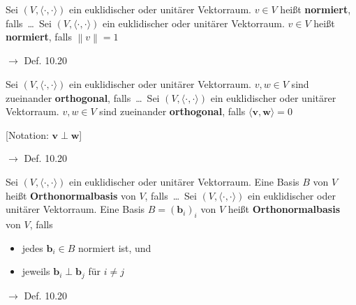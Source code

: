 \documentclass[11pt]{article}
\renewcommand{\cite}[1]{\par\bigskip\hfill{\color{gray}\tiny\(\to\) #1}}
\newcommand*{\norm}[1]{\left\|#1\right\|}
\newcommand*{\scprod}[2]{\langle #1, #2\rangle} %
\renewcommand{\vec}[1]{\mathbf{#1}}
\let\olddots\dots
\renewcommand{\dots}{\,\olddots\,}
\newenvironment{field}{}{\newpage}
\newif\ifnote
\newenvironment{note}{\notetrue}{\notefalse}
\newcommand{\localtag}{}
\newcommand{\globaltag}{}
\newcommand{\uuid}{}
\newcommand{\tags}[1]{
    \ifnote
        \renewcommand{\localtag}{#1}
    \else
        \renewcommand{\globaltag}{#1}
    \fi
    }
\newcommand{\xplain}[1]{\renewcommand{\uuid}{#1}}
\begin{document}
\begin{note}
    \tags{Def}
    \xplain{1794ed94-bdbc-11ec-9d64-0242ac120002}

    \begin{field}
        Sei \((V,\scprod{\cdot}{\cdot})\) ein euklidischer oder unitärer Vektorraum. \(v\in V\) heißt \textbf{normiert}, falls \dots
    \end{field}
    \begin{field}
        Sei \((V,\scprod{\cdot}{\cdot})\) ein euklidischer oder unitärer Vektorraum. \(v\in V\) heißt \textbf{normiert}, falls \(\norm{v} = 1\)
        \cite{Def. 10.20}
    \end{field}

    \begin{field}
        Sei \((V,\scprod{\cdot}{\cdot})\) ein euklidischer oder unitärer Vektorraum. \(v,w\in V\) sind zueinander \textbf{orthogonal}, falls \dots
    \end{field}
    \begin{field}
        Sei \((V,\scprod{\cdot}{\cdot})\) ein euklidischer oder unitärer Vektorraum. \(v,w\in V\) sind zueinander \textbf{orthogonal}, falls \(\scprod{\vec{v}}{\vec{w}} = 0\)

        [Notation: \(\vec{v}\perp\vec{w}\)]
        \cite{Def. 10.20}
    \end{field}

    \begin{field}
        Sei \((V,\scprod{\cdot}{\cdot})\) ein euklidischer oder unitärer Vektorraum. Eine Basis \(B\) von \(V\) heißt \textbf{Orthonormalbasis} von \(V\), falls \dots
    \end{field}
    \begin{field}
        Sei \((V,\scprod{\cdot}{\cdot})\) ein euklidischer oder unitärer Vektorraum. Eine Basis \(B=(\vec{b}_i)_i\) von \(V\) heißt \textbf{Orthonormalbasis} von \(V\), falls
        \begin{itemize}
            \item jedes \(\vec{b}_i\in B\) normiert ist, und
            \item jeweils \(\vec{b}_i\perp\vec{b}_j\) für \(i\neq j\)
        \end{itemize}
        \cite{Def. 10.20}
    \end{field}
\end{note}
\end{document}
